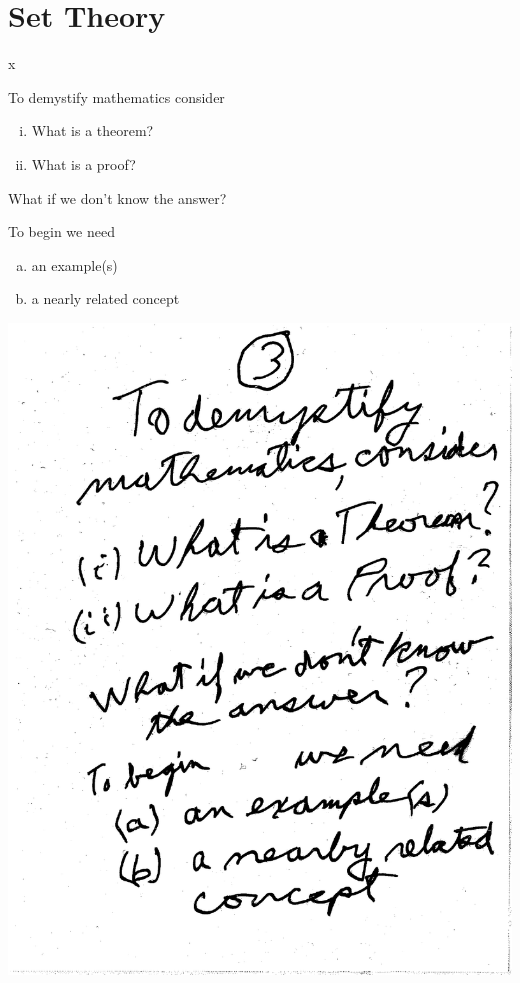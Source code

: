 \documentclass[10pt,a4paper]{article}
\begin{document}
\section{Set Theory}

x

To demystify mathematics consider
\begin{enumerate}[(i)]
\item What is a theorem?
\item What is a proof?
\end{enumerate}
What if we don't know the answer?

To begin we need
\begin{enumerate}[(a)]
\item an example(s)
\item a nearly related concept
\end{enumerate}


\includegraphics[scale=.5]{Pages/ST_3}

\newpage
\end{document}
